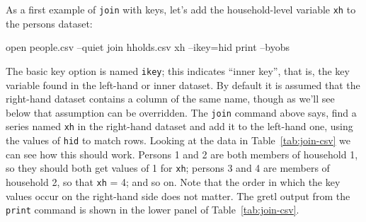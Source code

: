 As a first example of \texttt{join} with keys, let's add the
household-level variable \texttt{xh} to the persons dataset:
%
\begin{code}
open people.csv --quiet
join hholds.csv xh --ikey=hid
print --byobs
\end{code}

The basic key option is named \texttt{ikey}; this indicates ``inner
key'', that is, the key variable found in the left-hand or inner
dataset. By default it is assumed that the right-hand dataset contains
a column of the same name, though as we'll see below that assumption
can be overridden. The \texttt{join} command above says, find a series
named \texttt{xh} in the right-hand dataset and add it to the
left-hand one, using the values of \texttt{hid} to match rows.
Looking at the data in Table~\ref{tab:join-csv} we can see how this
should work. Persons 1 and 2 are both members of household 1, so they
should both get values of 1 for \texttt{xh}; persons 3 and 4 are
members of household 2, so that \texttt{xh} = 4; and so on. Note that
the order in which the key values occur on the right-hand side does
not matter.  The gretl output from the \texttt{print} command is shown
in the lower panel of Table~\ref{tab:join-csv}.


